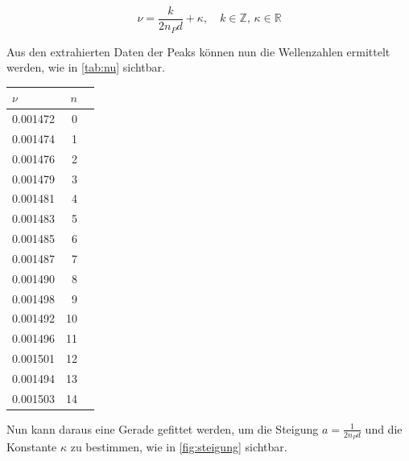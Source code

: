 \documentclass[11pt,ngerman]{scrartcl}
\begin{document}
\begin{equation}
	\nu = \frac{k}{2n_P d} + \kappa , \quad k\in \mathbb{Z}, \, \kappa \in \mathbb{R}
	\label{eq:wellenzfit}
\end{equation}

\noindent Aus den extrahierten Daten der Peaks können nun die Wellenzahlen ermittelt werden, wie in \autoref{tab:nu} sichtbar.

\newpage

\begin{table}
	\begin{center}
		\begin{tabular}{lrr}
			\toprule
			$\nu$    & $n$ \\
			\midrule
			0.001472 & 0   \\
			0.001474 & 1   \\
			0.001476 & 2   \\
			0.001479 & 3   \\
			0.001481 & 4   \\
			0.001483 & 5   \\
			0.001485 & 6   \\
			0.001487 & 7   \\
			0.001490 & 8   \\
			0.001498 & 9   \\
			0.001492 & 10  \\
			0.001496 & 11  \\
			0.001501 & 12  \\
			0.001494 & 13  \\
			0.001503 & 14  \\
			\bottomrule
		\end{tabular}
		\label{tab:nu}
	\end{center}
\end{table}


\noindent Nun kann daraus eine Gerade gefittet werden, um die Steigung $a = \frac{1}{2n_P d}$ und die Konstante $\kappa$ zu bestimmen, wie in \autoref{fig:steigung} sichtbar.
\end{document}

